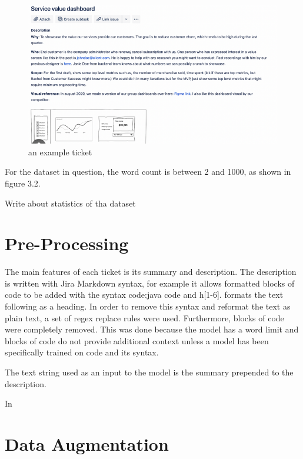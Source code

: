 \documentclass{UoYCSproject}
\begin{document}
\begin{figure}[h]
\includegraphics[width=\textwidth]{ticket-example}
\caption{an example ticket}
\label{fig:figure}
\end{figure}

For the dataset in question, the word count is between 2 and 1000, as shown in figure 3.2.


    Write about statistics of tha dataset

\section{Pre-Processing}\label{sec:preprocessing}

    The main features of each ticket is its summary and description.
The description is written with Jira Markdown syntax, for example it allows formatted blocks of code to be added with the syntax {code:java} {code} and h[1-6]. formats the text following as a heading.
In order to remove this syntax and reformat the text as plain text, a set of regex replace rules were used.
Furthermore, blocks of code were completely removed.
This was done because the model has a word limit and blocks of code do not provide additional context unless a model has been specifically trained on code and its syntax.\par

The text string used as an input to the model is the summary prepended to the description.

In
\section{Data Augmentation}\label{sec:data-augmentation}
\end{document}
